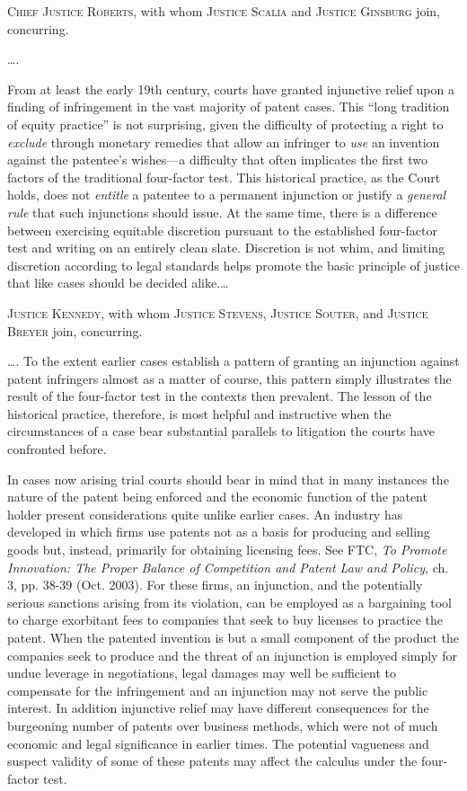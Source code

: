 \opinion \textsc{Chief Justice Roberts}, with whom \textsc{Justice Scalia} and
\textsc{Justice Ginsburg} join, concurring.

\ldots.

From at least the early 19th century, courts have granted injunctive relief upon
a finding of infringement in the vast majority of patent cases. This ``long
tradition of equity practice'' is not surprising, given the difficulty of
protecting a right to \textit{exclude} through monetary remedies that allow an
infringer to \textit{use} an invention against the patentee's wishes---a
difficulty that often implicates the first two factors of the traditional
four-factor test. This historical practice, as the Court holds, does not
\textit{entitle} a patentee to a permanent injunction or justify a
\textit{general rule} that such injunctions should issue.
At the same time, there is a
difference between exercising equitable discretion pursuant to the established
four-factor test and writing on an entirely clean slate. Discretion is not
whim, and limiting discretion according to legal standards helps promote the
basic principle of justice that like cases should be decided alike.\ldots



\opinion \textsc{Justice Kennedy}, with whom \textsc{Justice Stevens},
\textsc{Justice Souter}, and \textsc{Justice Breyer} join, concurring.

\ldots. To the extent
earlier cases establish a pattern of granting an injunction against patent
infringers almost as a matter of course, this pattern simply illustrates the
result of the four-factor test in the contexts then prevalent. The lesson of the
historical practice, therefore, is most helpful and instructive when the
circumstances of a case bear substantial parallels to litigation the courts have
confronted before.

In cases now arising trial courts should bear in mind that in many instances the
nature of the patent being enforced and the economic function of the patent
holder present considerations quite unlike earlier cases. An industry has
developed in which firms use patents not as a basis for producing and selling
goods but, instead, primarily for obtaining licensing fees. See FTC, \emph{To
Promote Innovation: The Proper Balance of Competition and Patent Law and
Policy}, ch. 3, pp. 38-39 (Oct. 2003).
For these firms, an injunction, and the potentially serious
sanctions arising from its violation, can be employed as a bargaining tool to
charge exorbitant fees to companies that seek to buy licenses to practice the
patent. When the patented invention is but a small component
of the product the companies seek to produce and the threat of an injunction is
employed simply for undue leverage in negotiations, legal damages may well be
sufficient to compensate for the infringement and an injunction may not serve
the public interest. In addition injunctive relief may have different
consequences for the burgeoning number of patents over business methods, which
were not of much economic and legal significance in earlier times. The potential
vagueness and suspect validity of some of these patents may affect the calculus
under the four-factor test.

